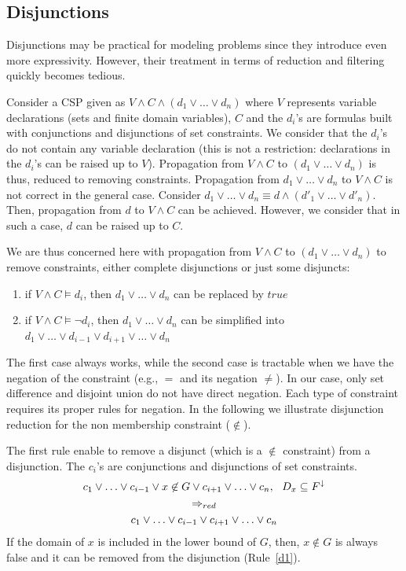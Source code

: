 \documentclass[3p,authoryear,times]{elsarticle}
\newcommand{\ms}[1]{{\MakeUppercase{#1}^\downarrow}}
\newcommand{\msF}[0]{\ms{f}}
\newcommand{\rmin}[0]{{\Rightarrow_{red}}}
\begin{document}
\color{black}

\subsection{Disjunctions}
\label{disjunction}

Disjunctions may be practical for modeling problems since they introduce even more expressivity. However, their treatment in terms of reduction and filtering quickly becomes tedious.

Consider a CSP given as $V \wedge C \wedge (d_1 \vee \ldots \vee d_n)$ where $V$ represents variable declarations (sets and finite domain variables), $C$ and the $d_i$'s are formulas built with conjunctions and disjunctions of set constraints. We consider that the $d_i$'s do not contain any variable declaration (this is not a restriction: declarations in the $d_i$'s can be 
raised up to $V$). Propagation from $V\wedge C$ to $(d_1 \vee \ldots \vee d_n)$ is thus, reduced to removing constraints. Propagation from $d_1 \vee \ldots \vee d_n$ to $V\wedge C$ is not correct in the general case. Consider $d_1 \vee \ldots \vee d_n \equiv d\wedge(d'_1 \vee \ldots \vee d'_n)$. Then, propagation from $d$ to $V\wedge C$ can be achieved. However, we consider that in such a case, $d$ can be raised up to $C$.

We are thus concerned here with propagation from $V\wedge C$ to $(d_1 \vee \ldots \vee d_n)$ to remove constraints, either  complete disjunctions or just some disjuncts:
\begin{enumerate}
\item if $V\wedge C \models d_i$, then $d_1 \vee \ldots \vee d_n$ can be replaced by $true$
\item if $V\wedge C \models \neg d_i$, then $d_1 \vee \ldots \vee d_n$ can be simplified into $d_1 \vee \ldots \vee d_{i-1} \vee d_{i+1}\vee \ldots \vee d_n$
\end{enumerate}
The first case always works, while the second case is tractable when we have the  negation of the constraint (e.g., $=$ and its negation $\not=$). In our case, only set difference and disjoint union do not have direct negation.
Each type of constraint requires its proper rules for negation. In the following we illustrate disjunction reduction for the non membership constraint ($\not \in$).


The first rule enable to remove a disjunct (which is a $\not \in$ constraint) from a disjunction. The $c_i$'s are conjunctions and disjunctions of set constraints. 
\begin{gather}	
c_1 \vee \ldots \vee c_{i-1} \vee x \not \in  G \vee c_{i+1} \vee \ldots \vee c_n, ~~
D_x \subseteq \msF  \nonumber \\
\rmin  \label{d1} \\
 c_1 \vee \ldots \vee c_{i-1} \vee c_{i+1} \vee \ldots \vee c_n  \nonumber
\end{gather}
If the domain of $x$ is included in the lower bound of $G$, then, $x \not \in G$ is always false and it can be removed from the disjunction (Rule~\ref{d1}).
\end{document}
